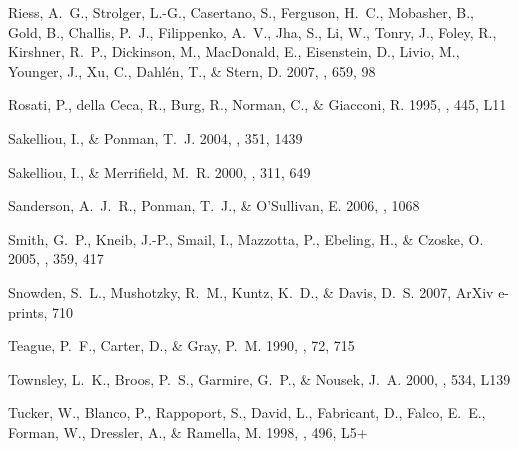 \documentclass[apj]{emulateapj}
\begin{document}
\begin{thebibliography}{}
{Riess}, A.~G., {Strolger}, L.-G., {Casertano}, S., {Ferguson}, H.~C.,
  {Mobasher}, B., {Gold}, B., {Challis}, P.~J., {Filippenko}, A.~V., {Jha}, S.,
  {Li}, W., {Tonry}, J., {Foley}, R., {Kirshner}, R.~P., {Dickinson}, M.,
  {MacDonald}, E., {Eisenstein}, D., {Livio}, M., {Younger}, J., {Xu}, C.,
  {Dahl{\'e}n}, T., \& {Stern}, D. 2007, \apj, 659, 98

{Rosati}, P., {della Ceca}, R., {Burg}, R., {Norman}, C., \& {Giacconi}, R.
  1995, \apjl, 445, L11

{Sakelliou}, I., \& {Ponman}, T.~J. 2004, \mnras, 351, 1439

{Sakelliou}, I., \& {Merrifield}, M.~R. 2000, \mnras, 311, 649

{Sanderson}, A.~J.~R., {Ponman}, T.~J., \& {O'Sullivan}, E. 2006, \mnras, 1068

{Smith}, G.~P., {Kneib}, J.-P., {Smail}, I., {Mazzotta}, P., {Ebeling}, H., \&
  {Czoske}, O. 2005, \mnras, 359, 417

{Snowden}, S.~L., {Mushotzky}, R.~M., {Kuntz}, K.~D., \& {Davis}, D.~S. 2007,
  ArXiv e-prints, 710

{Teague}, P.~F., {Carter}, D., \& {Gray}, P.~M. 1990, \apjs, 72, 715

{Townsley}, L.~K., {Broos}, P.~S., {Garmire}, G.~P., \& {Nousek}, J.~A. 2000,
  \apjl, 534, L139

{Tucker}, W., {Blanco}, P., {Rappoport}, S., {David}, L., {Fabricant}, D.,
  {Falco}, E.~E., {Forman}, W., {Dressler}, A., \& {Ramella}, M. 1998, \apjl,
  496, L5+


\end{thebibliography}
\end{document}
